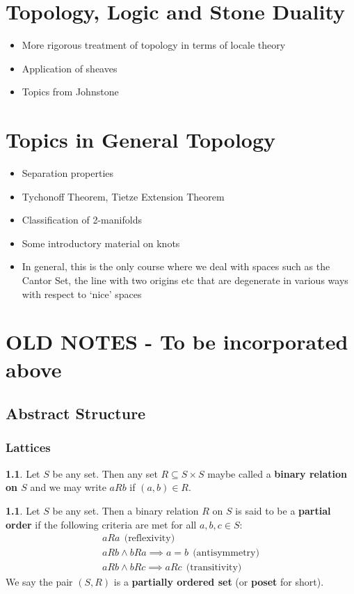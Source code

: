 \documentclass[oneside,english]{amsbook}
\numberwithin{section}{chapter}
\theoremstyle{plain}
\theoremstyle{definition}
\newtheorem{defn}[thm]{\protect\definitionname}
\providecommand{\definitionname}{Definition}
\begin{document}
\part{Topology, Logic and Stone Duality}
\begin{itemize}
	\item{More rigorous treatment of topology in terms of locale theory}
	\item{Application of sheaves}
	\item{Topics from Johnstone}
\end{itemize}

\part{Topics in General Topology}
		\begin{itemize}
	\item{Separation properties}
	\item{Tychonoff Theorem, Tietze Extension Theorem}
	\item{Classification of 2-manifolds}
	\item{Some introductory material on knots}
	\item{In general, this is the only course where we deal with spaces such as the Cantor Set, the line with two origins etc that are degenerate in various ways with respect to `nice' spaces}
\end{itemize}

\part{OLD NOTES - To be incorporated above}

\chapter{Abstract Structure}

\section{Lattices} 

\begin{defn} 
	Let $S$ be any set. Then any set $R\subseteq S\times S$ maybe called a \textbf{binary relation on $S$} and we may write $aRb$ if $(a,b)\in R$. 
\end{defn}


\begin{defn} 
	Let $S$ be any set. Then a binary relation $R$ on $S$ is said to be a \textbf{partial order }if the following criteria are met for all $a,b,c\in S$: 
	\begin{eqnarray*} 
		aRa\ \ \text{(reflexivity)}\\ 
		aRb\land bRa\implies a=b\ \ \text{(antisymmetry)}\\ 
		aRb\land bRc\implies aRc\ \ \text{(transitivity)} 
	\end{eqnarray*}
	 We say the pair $(S,R)$ is a \textbf{partially ordered set} (or \textbf{poset }for short). 
\end{defn} 
\end{document}
